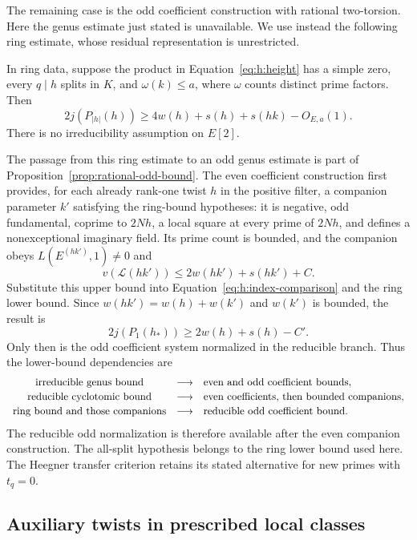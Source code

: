 The remaining case is the odd coefficient construction with rational
two-torsion. Here the genus estimate just stated is unavailable. We use
instead the following ring estimate, whose residual representation is
unrestricted.

\begin{theorem}\label{thm:heegner-ring-bound}
In ring data, suppose the product in
Equation~\eqref{eq:h:height} has a simple zero, every $q\mid h$ splits in
$K$, and $\omega(k)\le a$, where $\omega$ counts distinct prime factors.
Then
\begin{equation}\label{eq:h:ring-bound}
 2j(P_{|h|}(h))\ge
       4w(h)+s(h)+s(hk)-O_{E,a}(1).
\end{equation}
There is no irreducibility assumption on $E[2]$.
\end{theorem}

The passage from this ring estimate to an odd genus estimate is part
of Proposition~\ref{prop:rational-odd-bound}. The even coefficient construction
first provides, for each already rank-one twist $h$ in the positive
filter, a companion parameter $k'$ satisfying the ring-bound hypotheses:
it is negative, odd fundamental, coprime to $2Nh$, a local square at
every prime of $2Nh$, and defines a nonexceptional imaginary field.
Its prime count is bounded, and the companion obeys
$L(E^{(hk')},1)\ne0$ and
\[
       v(\mathcal L(hk'))\le2w(hk')+s(hk')+C.
\]
Substitute this upper bound into
Equation~\eqref{eq:h:index-comparison} and the ring lower bound.
Since $w(hk')=w(h)+w(k')$ and $w(k')$ is bounded, the result is
\[
                   2j(P_1(h_*))\ge2w(h)+s(h)-C'.
\]
Only then is the odd coefficient system normalized in the reducible
branch. Thus the lower-bound dependencies are
\[
 \begin{array}{c@{\quad\longrightarrow\quad}l}
 \text{irreducible genus bound}&\text{even and odd coefficient bounds},\\[2pt]
 \text{reducible cyclotomic bound}&\text{even coefficients, then bounded companions},\\[2pt]
 \text{ring bound and those companions}&\text{reducible odd coefficient bound}.
 \end{array}
\]
The reducible odd normalization is therefore available after the even
companion construction. The all-split hypothesis belongs to the ring
lower bound used here. The Heegner transfer criterion retains its stated
alternative for new primes with $t_q=0$.

\subsection{Auxiliary twists in prescribed local classes}

